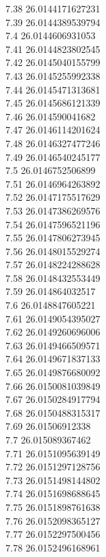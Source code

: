 {7.38	26.0144171627231\\
7.39	26.0144389539794\\
7.4	26.0144606931053\\
7.41	26.0144823802545\\
7.42	26.0145040155799\\
7.43	26.0145255992338\\
7.44	26.0145471313681\\
7.45	26.0145686121339\\
7.46	26.014590041682\\
7.47	26.0146114201624\\
7.48	26.0146327477246\\
7.49	26.0146540245177\\
7.5	26.0146752506899\\
7.51	26.0146964263892\\
7.52	26.0147175517629\\
7.53	26.0147386269576\\
7.54	26.0147596521196\\
7.55	26.0147806273945\\
7.56	26.0148015529274\\
7.57	26.0148224288628\\
7.58	26.0148432553449\\
7.59	26.014864032517\\
7.6	26.0148847605221\\
7.61	26.0149054395027\\
7.62	26.0149260696006\\
7.63	26.0149466509571\\
7.64	26.0149671837133\\
7.65	26.0149876680092\\
7.66	26.0150081039849\\
7.67	26.0150284917794\\
7.68	26.0150488315317\\
7.69	26.01506912338\\
7.7	26.015089367462\\
7.71	26.0151095639149\\
7.72	26.0151297128756\\
7.73	26.0151498144802\\
7.74	26.0151698688645\\
7.75	26.0151898761638\\
7.76	26.0152098365127\\
7.77	26.0152297500456\\
7.78	26.0152496168961\\
}

